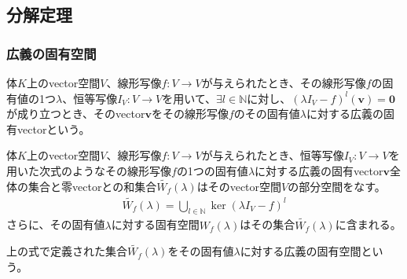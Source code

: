 \documentclass[dvipdfmx]{jsarticle}
\begin{document}
\subsection{分解定理}%
\subsubsection{広義の固有空間}%
\begin{dfn}\label{広義の固有vector}
体$K$上のvector空間$V$、線形写像$f:V \rightarrow V$が与えられたとき、その線形写像$f$の固有値の1つ$\lambda$、恒等写像$I_{V}:V \rightarrow V$を用いて、$\exists l \in \mathbb{N}$に対し、$\left( \lambda I_{V} - f \right)^{l}\left( \mathbf{v} \right) = \mathbf{0}$が成り立つとき、そのvector$\mathbf{v}$をその線形写像$f$のその固有値$\lambda$に対する広義の固有vectorという。
\end{dfn}
\begin{thm}
\label{2.2.4.1}
体$K$上のvector空間$V$、線形写像$f:V \rightarrow V$が与えられたとき、恒等写像$I_{V}:V \rightarrow V$を用いた次式のようなその線形写像$f$の1つの固有値$\lambda$に対する広義の固有vector$\mathbf{v}$全体の集合と零vectorとの和集合$\widetilde{W_{f}}(\lambda)$はそのvector空間$V$の部分空間をなす。
\begin{align*}
\widetilde{W_{f}}(\lambda) = \bigcup_{l \in \mathbb{N}} {\ker\left( \lambda I_{V} - f \right)^{l}}
\end{align*}
さらに、その固有値$\lambda$に対する固有空間$W_{f}(\lambda)$はその集合$\widetilde{W_{f}}(\lambda)$に含まれる。
\end{thm}
\begin{dfn}\label{広義の固有空間}
上の式で定義された集合$\widetilde{W_{f}}(\lambda)$をその固有値$\lambda$に対する広義の固有空間という。
\end{dfn}
\end{document}
